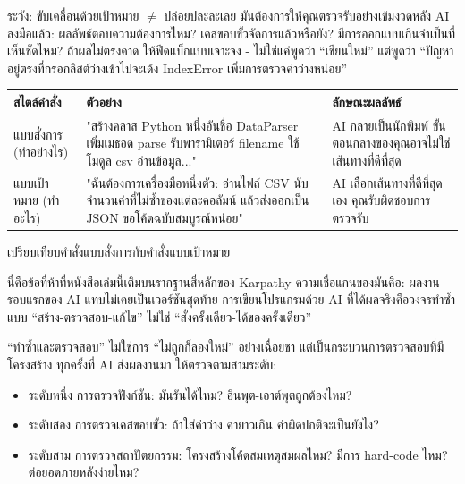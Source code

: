 \begin{tcbwarn}{ระวัง: ขับเคลื่อนด้วยเป้าหมาย $\neq$ ปล่อยปละละเลย}
มันต้องการให้คุณตรวจรับอย่างเข้มงวดหลัง AI ลงมือแล้ว: ผลลัพธ์ตอบความต้องการไหม? เคสขอบขั้วจัดการแล้วหรือยัง? มีการออกแบบเกินจำเป็นที่เห็นชัดไหม? ถ้าผลไม่ตรงคาด ให้ฟีดแบ็กแบบเจาะจง - ไม่ใช่แค่พูดว่า “เขียนใหม่” แต่พูดว่า “ปัญหาอยู่ตรงที่กรอกลิสต์ว่างเข้าไปจะเด้ง IndexError เพิ่มการตรวจค่าว่างหน่อย”

\end{tcbwarn}

\begin{center}
\begin{tabularx}{\linewidth}{|X|X|X|}
\hline
\textbf{สไตล์คำสั่ง} & \textbf{ตัวอย่าง} & \textbf{ลักษณะผลลัพธ์} \tabularnewline
\hline
แบบสั่งการ (ทำอย่างไร) & "สร้างคลาส Python หนึ่งอันชื่อ DataParser เพิ่มเมธอด parse รับพารามิเตอร์ filename ใช้โมดูล csv อ่านข้อมูล..." & AI กลายเป็นนักพิมพ์ ขั้นตอนกลางของคุณอาจไม่ใช่เส้นทางที่ดีที่สุด \tabularnewline
แบบเป้าหมาย (ทำอะไร) & "ฉันต้องการเครื่องมือหนึ่งตัว: อ่านไฟล์ CSV นับจำนวนค่าที่ไม่ซ้ำของแต่ละคอลัมน์ แล้วส่งออกเป็น JSON ขอโค้ดฉบับสมบูรณ์หน่อย" & AI เลือกเส้นทางที่ดีที่สุดเอง คุณรับผิดชอบการตรวจรับ \tabularnewline
\hline
\end{tabularx}
\end{center}

\begin{center}\small\color{gray}เปรียบเทียบคำสั่งแบบสั่งการกับคำสั่งแบบเป้าหมาย\end{center}


นี่คือข้อที่ห้าที่หนังสือเล่มนี้เติมบนรากฐานสี่หลักของ Karpathy ความเชื่อแกนของมันคือ: ผลงานรอบแรกของ AI แทบไม่เคยเป็นเวอร์ชันสุดท้าย การเขียนโปรแกรมด้วย AI ที่ได้ผลจริงคือวงจรทำซ้ำแบบ “สร้าง-ตรวจสอบ-แก้ไข” ไม่ใช่ “สั่งครั้งเดียว-ได้ของครั้งเดียว”

“ทำซ้ำและตรวจสอบ” ไม่ใช่การ “ไม่ถูกก็ลองใหม่” อย่างเฉื่อยชา แต่เป็นกระบวนการตรวจสอบที่มีโครงสร้าง ทุกครั้งที่ AI ส่งผลงานมา ให้ตรวจตามสามระดับ:

\begin{itemize}
  \item ระดับหนึ่ง การตรวจฟังก์ชัน: มันรันได้ไหม? อินพุต-เอาต์พุตถูกต้องไหม?
  \item ระดับสอง การตรวจเคสขอบขั้ว: ถ้าใส่ค่าว่าง ค่ายาวเกิน ค่าผิดปกติจะเป็นยังไง?
  \item ระดับสาม การตรวจสถาปัตยกรรม: โครงสร้างโค้ดสมเหตุสมผลไหม? มีการ hard-code ไหม? ต่อยอดภายหลังง่ายไหม?
\end{itemize}

